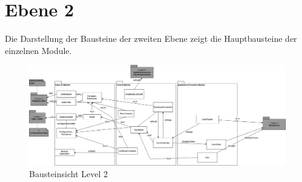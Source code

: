 \section{Ebene 2}
Die Darstellung der Bausteine der zweiten Ebene zeigt die Hauptbausteine der einzelnen Module.
\begin{figure}[h]
	\centering
	\includegraphics[width=1\textwidth]{Graphics/bausteinansicht_ebene_2.png}
	\caption{Bausteinsicht Level 2}
	\label{fig:bausteinsichtlvl2}
\end{figure}                 
